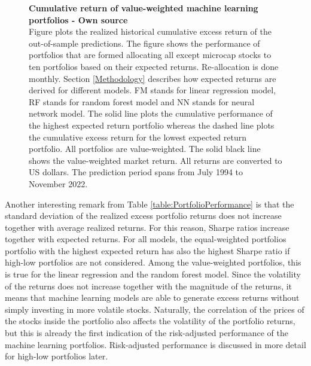 \documentclass[12pt]{article}
\begin{document}
\begin{figure}[ht]
\centering
\caption[Cumulative return of value-weighted machine learning portfolios]{\textbf{Cumulative return of value-weighted machine learning portfolios \textnormal{- Own source}}\\ Figure plots the realized historical cumulative excess return of the out-of-sample predictions. The figure shows the performance of portfolios that are formed allocating all except microcap stocks to ten portfolios based on their expected returns. Re-allocation is done monthly. Section \ref{Methodology} describes how expected returns are derived for different models. FM stands for linear regression model, RF stands for random forest model and NN stands for neural network model. The solid line plots the cumulative performance of the highest expected return portfolio whereas the dashed line plots the cumulative excess return for the lowest expected return portfolio. All portfolios are value-weighted. The solid black line shows the value-weighted market return. All returns are converted to US dollars. The prediction period spans from July 1994 to November 2022.}

\label{plot:cumul_vw_portf_return}
\end{figure}

Another interesting remark from Table \ref{table:PortfolioPerformance} is that the standard deviation of the realized excess portfolio returns does not increase together with average realized returns. For this reason, Sharpe ratios increase together with expected returns. For all models, the equal-weighted portfolios portfolio with the highest expected return has also the highest Sharpe ratio if high-low portfolios are not considered. Among the value-weighted portfolios, this is true for the linear regression and the random forest model. Since the volatility of the returns does not increase together with the magnitude of the returns, it means that machine learning models are able to generate excess returns without simply investing in more volatile stocks. Naturally, the correlation of the prices of the stocks inside the portfolio also affects the volatility of the portfolio returns, but this is already the first indication of the risk-adjusted performance of the machine learning portfolios. Risk-adjusted performance is discussed in more detail for high-low portfolios later. \par
\end{document}
